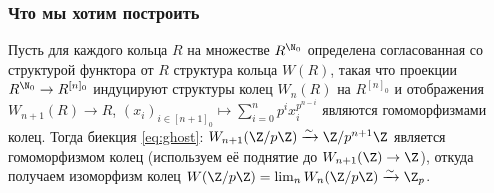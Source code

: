 \documentclass[
	extrafontsizes,
	11pt,
	hyphens,
]{memoir}
\begin{document}
\subsubsection{Что мы хотим построить}

Пусть для каждого кольца \(R\)
на множестве \(R^{\N_0}\) определена согласованная со структурой функтора от \(R\) структура кольца \(W(R)\),
такая что
проекции
\(
R^{\N_0} \to R^{[n]_0}
\)
индуцируют структуры колец \(W_n(R)\) на \(R^{[n]_0}\)
и отображения
\(
W_{n+1}(R) \to R
\),
\(
(x_i)_{i \in [n+1]_0}
\mapsto
\sum_{i=0}^n p^i x_i^{p^{n-i}}
\)
являются гомоморфизмами колец.
Тогда биекция \eqref{eq:ghost}: \(W_{n+1}(\Z/p\Z) \xrightarrow{\sim} \Z/p^{n+1}\Z\) является гомоморфизмом колец (используем её поднятие до \(W_{n+1}(\Z) \to \Z\)), откуда получаем изоморфизм колец
\(W(\Z/p\Z) = \lim_n W_n(\Z/p\Z) \xrightarrow{\sim} \Z_p\).
%
%
%
%
\end{document}
